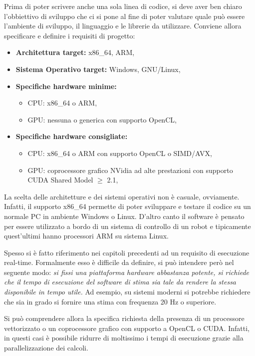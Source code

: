 Prima di poter scrivere anche una sola linea di codice, si deve aver ben chiaro l'obbiettivo di sviluppo che ci si pone al fine di poter valutare quale può essere l'ambiente di sviluppo, il linguaggio e le librerie da utilizzare.  Conviene allora specificare e definire i requisiti di progetto:
\begin{itemize}
	\item \textbf{Architettura target:}  x86\_64, ARM,
	\item \textbf{Sistema Operativo target:}  Windows, GNU/Linux,
	\item \textbf{Specifiche hardware minime:}
	\begin{itemize}
		\item CPU: x86\_64 o ARM,
		\item GPU: nessuna o generica con supporto OpenCL,
	\end{itemize} 
	\item \textbf{Specifiche hardware consigliate:}
		\begin{itemize}
			\item CPU: x86\_64 o ARM con supporto OpenCL o SIMD/AVX,
			\item GPU: coprocessore grafico NVidia ad alte prestazioni con supporto CUDA Shared Model $\ge$ 2.1,
		\end{itemize}			 
\end{itemize}

La scelta delle architetture e dei sistemi operativi non è casuale, ovviamente. Infatti, il supporto x86\_64 permette di poter sviluppare e testare il codice su un normale PC in ambiente Windows o Linux. D'altro canto il software è pensato per essere utilizzato a bordo di un sistema di controllo di un robot e tipicamente quest'ultimi hanno processori ARM su sistema Linux.

Spesso si è fatto riferimento nei capitoli precedenti ad un requisito di esecuzione real-time. Formalmente esso è difficile da definire, si può intendere però nel seguente modo: \textit{si fissi una piattaforma hardware abbastanza potente, si richiede che il tempo di esecuzione del software di stima sia tale da rendere la stessa disponibile in tempo utile.} Ad esempio, su sistemi moderni si potrebbe richiedere che sia in grado si fornire una stima con frequenza 20 Hz o superiore.
 
Si può comprendere allora la specifica richiesta della presenza di un processore vettorizzato o un coprocessore grafico con supporto a OpenCL o CUDA. Infatti, in questi casi è possibile ridurre di moltissimo i tempi di esecuzione grazie alla parallelizzazione dei calcoli.

